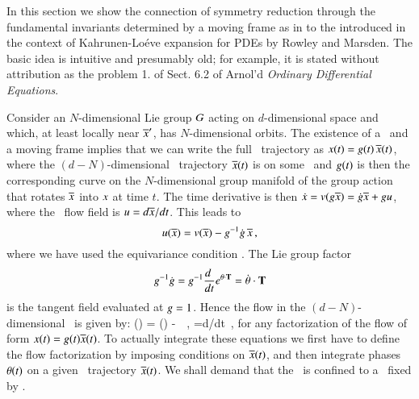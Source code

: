 In this section we show the connection of symmetry reduction through the
fundamental invariants determined  by a moving frame as in 
to the \emph{\mframes} introduced in the context of Kahrunen-Lo\'eve
expansion for PDEs by Rowley and Marsden.
The basic idea is intuitive and presumably old; for example, it is stated
without attribution as the problem 1. of Sect. 6.2 of Arnol'd
{\em Ordinary Differential Equations}.

Consider an $N$-dimensional Lie group $G$ acting on $d$-dimensional
space and which, at least locally near ${\overline{x}'}$, has $N$-dimensional orbits.
The existence of a \slice\ and a moving frame implies that we can
write the full \statesp\
trajectory as $x(t)= g(t)\,\overline{x}(t)$, where the
$(d\!-\!N)$-dimensional \reducedsp\ trajectory $\overline{x}(t)$
is on some \slice\, and $g(t)$ is then the
corresponding curve on the $N$-dimensional group manifold of
the group action that rotates $\overline{x}$ into $x$ at time
$t$. The time derivative is then $\dot{x}=
v(g\overline{x}) = \dot{g}\overline{x} + gu$,
where the \reducedsp\ flow field is
$u={d\overline{x}}/{dt}$. This leads to
\[
u(\overline{x}) = v(\overline{x}) - g^{-1} \dot{g} \, \overline{x}
\,,
\]
where we have used the equivariance condition
. The Lie group factor
\[
g^{-1} \dot{g} =
g^{-1}\frac{d~}{dt} e^{{\bf \theta} \cdot \mathbf{T} } =
\dot{{\bf \theta}} \cdot \mathbf{T}
\]
is the tangent field evaluated at ${g} = 1$.
Hence the flow in the
$(d\!-\!N)$-dimensional \reducedsp\ is given by:
\beq
\velRed(\sspRed) = \vel(\sspRed) - \dot{\gSpace} \cdot \Lg \, \sspRed
\,,\qquad
\velRed={d\sspRed}/{dt}
\,,
for any factorization of the flow of form $x(t)=
g(t)\overline{x}(t)$. To actually integrate these equations
we first have to define the flow factorization by imposing
conditions on $\overline{x}(t)$, and then integrate phases
${\bf \theta}(t)$ on a given \reducedsp\ trajectory $\overline{x}(t)$.
We shall demand that the \reducedsp\ is confined to a \slice\
fixed by .

